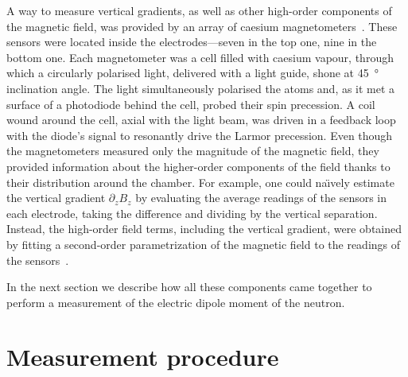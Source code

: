 A way to measure vertical gradients, as well as other high-order components of the magnetic field, was provided by an array of caesium magnetometers~\cite{Groeger2005}.
These sensors were located inside the electrodes---seven in the top one, nine in the bottom one.
Each magnetometer was a cell filled with caesium vapour, through which a circularly polarised light, delivered with a light guide, shone at \SI{45}{\degree} inclination angle.
The light simultaneously polarised the atoms and, as it met a surface of a photodiode behind the cell, probed their spin precession.
A coil wound around the cell, axial with the light beam, was driven in a feedback loop with the diode's signal to resonantly drive the Larmor precession.
Even though the magnetometers measured only the magnitude of the magnetic field, they provided information about the higher-order components of the field thanks to their distribution around the chamber.
For example, one could na\"\i vely estimate the vertical gradient $\partial_z B_z$ by evaluating the average readings of the sensors in each electrode, taking the difference and dividing by the vertical separation.
Instead, the high-order field terms, including the vertical gradient, were obtained by fitting a second-order parametrization of the magnetic field to the readings of the sensors~\cite{WurstenThesis}.

In the next section we describe how all these components came together to perform a measurement of the electric dipole moment of the neutron.



\section{Measurement procedure}
\label{sec:measurement_procedure}


